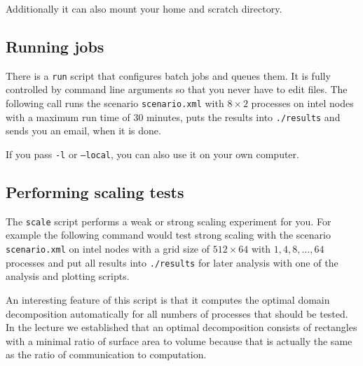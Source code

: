 Additionally it can also mount your home and scratch directory.

\subsection{Running jobs}

There is a \texttt{run} script that configures batch jobs and queues them. It is
fully controlled by command line arguments so that you never have to edit
files. The following call runs the scenario \texttt{scenario.xml} with
$8 \times 2$ processes on intel nodes with a maximum run time of 30 minutes,
puts the results into \texttt{./results} and sends you an email, when it is
done.


If you pass \texttt{-l} or \texttt{--local}, you can also use it on your own computer.

\subsection{Performing scaling tests}

The \texttt{scale} script performs a weak or strong scaling experiment for
you. For example the following command would test strong scaling with the
scenario \texttt{scenario.xml} on intel nodes with a grid size of
$512 \times 64$ with $1, 4, 8, \dots, 64$ processes and put all results into
\texttt{./results} for later analysis with one of the analysis and plotting
scripts.


An interesting feature of this script is that it computes the optimal domain
decomposition automatically for all numbers of processes that should be
tested. In the lecture we established that an optimal decomposition consists of
rectangles with a minimal ratio of surface area to volume because that is
actually the same as the ratio of communication to computation.

